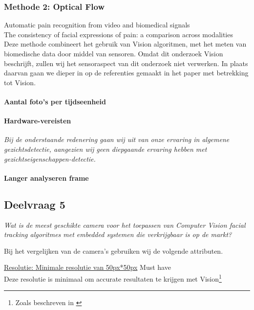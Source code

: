 \documentclass[11pt]{article}
\begin{document}
    \subsubsection{Methode 2: Optical Flow}
    \emph{\citet{werner2014automatic}} Automatic pain recognition from video and biomedical signals\\
    \emph{\citet{prkachin1992consistency}} The consistency of facial expressions of pain: a comparison across modalities\\
    Deze methode combineert het gebruik van Vision algoritmen, met het meten van biomedische data door middel van sensoren.
    Omdat dit onderzoek Vision beschrijft, zullen wij het sensoraspect van dit onderzoek niet verwerken. In plaats daarvan gaan we dieper in op de referenties gemaakt in het paper met betrekking tot Vision.

    \paragraph{Aantal foto's per tijdseenheid}

    \paragraph{Hardware-vereisten}

    \emph{Bij de onderstaande redenering gaan wij uit van onze ervaring in algemene gezichtsdetectie, aangezien wij geen diepgaande ervaring hebben met gezichtseigenschappen-detectie.}

    \paragraph{Langer analyseren frame}

    \subsection{Deelvraag 5 }\label{subsec:deelvraag-5}
    \emph{Wat is de meest geschikte camera voor het toepassen van Computer Vision facial tracking algoritmes met embedded systemen die verkrijgbaar is op de markt?}

    Bij het vergelijken van de camera's gebruiken wij de volgende attributen.

    \vspace{1em}

    \noindent \underline{Resolutie: Minimale resolutie van 50px*50px} \hfill Must have\\
    Deze resolutie is minimaal om accurate resultaten te krijgen met Vision\footnote{Zoals beschreven in \citet{boom2006effect}}
\end{document}

